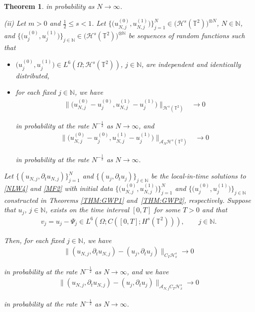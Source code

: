 \documentclass[letterpaper, 11pt,  reqno]{amsart}
\newtheorem{theorem}{Theorem}[section]
\newcommand{\1}{\hspace{0.5mm}\text{I}\hspace{0.2mm}}
\newcommand{\noi}{\noindent}
\newcommand{\T}{\mathbb{T}}
\newcommand{\N}{\mathbb{N}}
\renewcommand{\H}{\mathcal{H}}
\newcommand{\dt}{\partial_t}
\newcommand{\A}{\mathcal{A}}
\newcommand{\too}{\longrightarrow}
\renewcommand{\O}{\Omega}
\numberwithin{equation}{section}
\numberwithin{theorem}{section}
\begin{document}
\begin{theorem}
\noi
in probability as $N \to \infty$.



\medskip


\noi
\textup{(ii)}
Let $m > 0$ and  $\frac 12 \le s < 1$.
Let 
$\big\{ \big(u_{N, j}^{(0)}, u_{N, j}^{(1)}\big)\big\}_{j = 1}^N
\in \big(\H^s (\T^2)\big)^{\otimes N}$, $N \in \N$, 
and 
$\big\{\big(u_{j}^{(0)}, u_{ j}^{(1)}\big)\big\}_{j \in \N}
\in \big(\H^s (\T^2)\big)^{\otimes \N}$
be sequences of random functions
such that 

\smallskip

\begin{itemize}
\item
$\big(u_{j}^{(0)}, u_{ j}^{(1)}\big)
\in L^6(\O; \H^s (\T^2))$, $j \in \N$, 
 are independent and identically distributed, 


\smallskip

\item 
for each fixed $j \in \N$, we have 
\begin{align}
 \big\| \big( u_{N, j}^{(0)} - u_{j}^{(0)}, u_{N, j}^{(1)} -u_{j}^{(1)} \big) \big\|_{\H^s (\T^2)} 
& \too 0  
\label{IV5}
\end{align}


\noi
in probability at the rate $N^{-\frac 12}$ as $N \to \infty$, and 
\begin{align}
 \big\| 
\big( u_{N, j}^{(0)} - u_{j}^{(0)}, u_{N, j}^{(1)} -u_{j}^{(1)} \big)
 \big\|_{\A_N \H^s (\T^2)} 
 & \longrightarrow 0
\label{IV6}
\end{align}

\noi
in probability 
at the rate $N^{-\frac 12}$
as $N \to \infty$.


\end{itemize}


\noi
Let 
$\{ (u_{N, j}, \dt  u_{N, j})\}_{j = 1}^N$
and $\{(u_j, \dt u_j)\}_{j \in \N}$
be the local-in-time solutions to \eqref{NLW4} 
and \eqref{MF2}
with initial data $\big\{ \big(u_{N, j}^{(0)}, u_{N, j}^{(1)}\big)\big\}_{j = 1}^N$
and $\big\{\big(u_{j}^{(0)}, u_{ j}^{(1)}\big)\big\}_{j \in \N}$
  constructed in Theorems \ref{THM:GWP1}
and~\ref{THM:GWP2}, respectively.
Suppose that $u_j$, $j \in \N$,  exists on the time interval $[0, T]$
for some $T > 0$
and that 
\begin{align}
v_j  = u_j - \Psi_j \in L^6 (\Omega; C([0, T]; H^{s} (\T^2))), \qquad j \in \N.
\label{IV6a}
\end{align}


\noi
Then,    for each fixed $j \in \N$, we have
\begin{align*}
 \| (u_{N, j}, \dt u_{N, j})   - (u_j, \dt u_j) \|_{ C_T  \H^s_x}
\too 0
\end{align*}

\noi
in probability 
at the rate $N^{-\frac 12}$
as $N \to \infty$, and we have
\begin{align*}
  \| (u_{N, j}, \dt u_{N, j})   - (u_j, \dt u_j) \|_{\A_{N, j} C_T  \H^s_x}
\too 0
\end{align*}

\noi
in probability 
at the rate $N^{-\frac 12}$
as $N \to \infty$.


\end{theorem}
\end{document}
